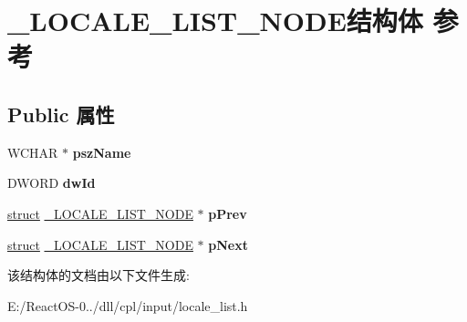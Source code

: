 \hypertarget{struct___l_o_c_a_l_e___l_i_s_t___n_o_d_e}{}\section{\+\_\+\+L\+O\+C\+A\+L\+E\+\_\+\+L\+I\+S\+T\+\_\+\+N\+O\+D\+E结构体 参考}
\label{struct___l_o_c_a_l_e___l_i_s_t___n_o_d_e}
\subsection*{Public 属性}
\begin{DoxyCompactItemize}
\item 
\mbox{\label{struct___l_o_c_a_l_e___l_i_s_t___n_o_d_e_ac01f4183dd817c25a49de33ba0901ee8}} 
W\+C\+H\+AR $\ast$ {\bfseries psz\+Name}
\item 
\mbox{\label{struct___l_o_c_a_l_e___l_i_s_t___n_o_d_e_ac597b22c452872c278a77933aa31a96b}} 
D\+W\+O\+RD {\bfseries dw\+Id}
\item 
\mbox{\label{struct___l_o_c_a_l_e___l_i_s_t___n_o_d_e_ab374c82be25a8f40a96ad743ae52c336}} 
\hyperlink{interfacestruct}{struct} \hyperlink{struct___l_o_c_a_l_e___l_i_s_t___n_o_d_e}{\+\_\+\+L\+O\+C\+A\+L\+E\+\_\+\+L\+I\+S\+T\+\_\+\+N\+O\+DE} $\ast$ {\bfseries p\+Prev}
\item 
\mbox{\label{struct___l_o_c_a_l_e___l_i_s_t___n_o_d_e_afaa3d2bb258529182e9ed4f030aa8db6}} 
\hyperlink{interfacestruct}{struct} \hyperlink{struct___l_o_c_a_l_e___l_i_s_t___n_o_d_e}{\+\_\+\+L\+O\+C\+A\+L\+E\+\_\+\+L\+I\+S\+T\+\_\+\+N\+O\+DE} $\ast$ {\bfseries p\+Next}
\end{DoxyCompactItemize}


该结构体的文档由以下文件生成\+:\begin{DoxyCompactItemize}
\item 
E\+:/\+React\+O\+S-\/0../dll/cpl/input/locale\+\_\+list.\+h\end{DoxyCompactItemize}
